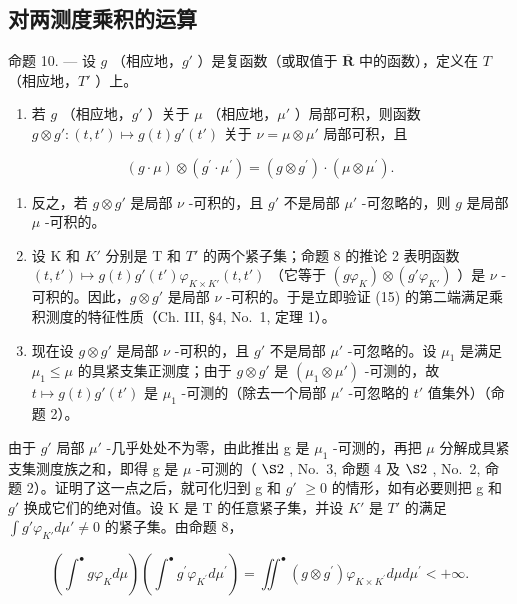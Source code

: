 \subsection{对两测度乘积的运算}

命题 10. --- 设 \(g\) （相应地，\(g'\) ）是复函数（或取值于 \(\overline{\mathbf{R}}\) 中的函数），定义在 \(T\) （相应地，\(T'\) ）上。

\begin{enumerate}
\def\labelenumi{\alph{enumi})}
\tightlist
\item
  若 \(g\) （相应地，\(g'\) ）关于 \(\mu\) （相应地，\(\mu'\) ）局部可积，则函数 \(g \otimes g': (t, t') \mapsto g(t)g'(t')\) 关于 \(\nu = \mu \otimes \mu'\) 局部可积，且
\end{enumerate}

\[
(g \cdot \mu) \otimes (g ^ {\prime} \cdot \mu^ {\prime}) = (g \otimes g ^ {\prime}) \cdot (\mu \otimes \mu^ {\prime}).\tag{15}
\]

\begin{enumerate}
\def\labelenumi{\alph{enumi})}
\setcounter{enumi}{1}
\item
  反之，若 \(g \otimes g'\) 是局部 \(\nu\) -可积的，且 \(g'\) 不是局部 \(\mu'\) -可忽略的，则 \(g\) 是局部 \(\mu\) -可积的。
\item
  设 K 和 \(K'\) 分别是 T 和 \(T'\) 的两个紧子集；命题 8 的推论 2 表明函数 \((t, t') \mapsto g(t)g'(t')\varphi_{K \times K'}(t, t')\) （它等于 \((g\varphi_{K}) \otimes (g'\varphi_{K'})\) ）是 \(\nu\) -可积的。因此，\(g \otimes g'\) 是局部 \(\nu\) -可积的。于是立即验证 (15) 的第二端满足乘积测度的特征性质（Ch. III, §4, No.~1, 定理 1）。
\item
  现在设 \(g \otimes g'\) 是局部 \(\nu\) -可积的，且 \(g'\) 不是局部 \(\mu'\) -可忽略的。设 \(\mu_1\) 是满足 \(\mu_1 \leqslant \mu\) 的具紧支集正测度；由于 \(g \otimes g'\) 是 \((\mu_1 \otimes \mu')\) -可测的，故 \(t \mapsto g(t)g'(t')\) 是 \(\mu_1\) -可测的（除去一个局部 \(\mu'\) -可忽略的 \(t'\) 值集外）（命题 2）。
\end{enumerate}

由于 \(g'\) 局部 \(\mu'\) -几乎处处不为零，由此推出 g 是 \(\mu_{1}\) -可测的，再把 \(\mu\) 分解成具紧支集测度族之和，即得 g 是 \(\mu\) -可测的（ \(\S2\) , No.~3, 命题 4 及 \(\S2\) , No.~2, 命题 2）。证明了这一点之后，就可化归到 g 和 \(g'\) \(\geqslant0\) 的情形，如有必要则把 g 和 \(g'\) 换成它们的绝对值。设 K 是 T 的任意紧子集，并设 \(K'\) 是 \(T'\) 的满足 \(\int g'\varphi_{K'}d\mu'\neq0\) 的紧子集。由命题 8，

\[
\left(\int^ {\bullet} g \varphi_ {K} d \mu\right) \left(\int^ {\bullet} g ^ {\prime} \varphi_ {K ^ {\prime}} d \mu^ {\prime}\right) = \iint^ {\bullet} (g \otimes g ^ {\prime}) \varphi_ {K \times K ^ {\prime}} d \mu d \mu^ {\prime} <   + \infty .
\]

